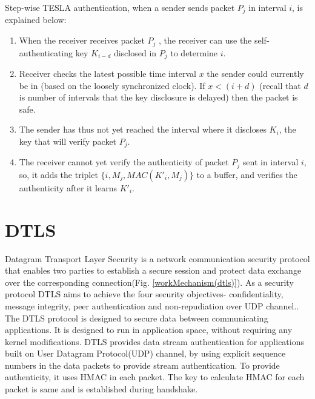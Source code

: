 Step-wise TESLA authentication, when a sender sends packet $P_{j}$ in interval $i$, is explained below:
\begin{enumerate}
    \item When the receiver receives packet $P_{j}$ , the receiver can use the self-authenticating key $K_{i-d}$ disclosed in $P_{j}$ to determine $i$.
    \item Receiver checks the latest possible time interval $x$ the sender could currently be in (based on the loosely synchronized clock). If $x<(i+d)$ (recall that $d$ is number of intervals that the key disclosure is delayed) then the packet is safe.
    \item The sender has thus not yet reached the interval where it discloses $K_{i}$, the key that will verify packet $P_{j}$.
    \item The receiver cannot yet verify the authenticity of packet  $P_{j}$ sent in interval $i$, so, it adds the triplet $\{i, M_{j} , MAC(K'_{i}, M_{j} )\}$ to a buffer, and verifies the authenticity after it learns $K'_{i}$.
\end{enumerate}


 
     














\section{DTLS}
\label{dtls}
Datagram Transport Layer Security is a network communication security protocol that enables two parties to establish a secure session and protect data exchange over the corresponding connection(Fig. \ref{workMechanism(dtls)}). As a security protocol DTLS aims to achieve the four security objectives- confidentiality, message integrity, peer authentication and non-repudiation  over UDP channel.\cite{kothmayr2013dtls}. 
The DTLS protocol is designed to secure data between communicating applications.  It is designed to run in application space, without requiring any kernel modifications. 
DTLS provides data stream authentication for applications built on User Datagram Protocol(UDP) channel, by using explicit sequence numbers in the data packets to provide stream authentication. To provide authenticity, it uses HMAC in each packet. The key to calculate HMAC for each packet is same and is established during handshake.

